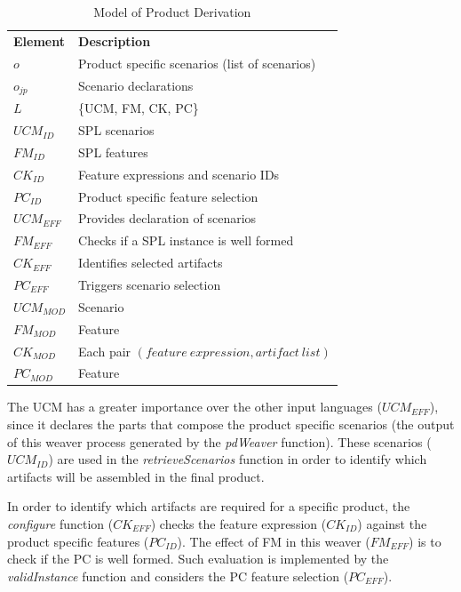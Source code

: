 \documentclass[11pt]{report}
\begin{document}
\begin{table}[htb]
\begin{center}
 \caption{Model of Product Derivation} \label{tab:pd-weaver}
\begin{tabular}{p{0.6in}p{2.4in}}
   \hline\noalign{\smallskip}
  {\bf Element} & {\bf Description} \\
   \noalign{\smallskip}
   \hline
   \noalign{\smallskip}
   $o$               & Product specific scenarios (list of scenarios) \\ 
   $o_{jp}$        & Scenario declarations \\ 
   $L$               & \{UCM, FM, CK, PC\} \\ 
   $UCM_{ID}$ & SPL scenarios \\ 
   $FM_{ID}$    & SPL features \\ 
   $CK_{ID}$    & Feature expressions and scenario IDs\\  
   $PC_{ID}$    & Product specific feature selection \\ 
   $UCM_{EFF}$ & Provides declaration of scenarios \\  
   $FM_{EFF}$    & Checks if a SPL instance is well formed \\ 
   $CK_{EFF}$    & Identifies selected artifacts  \\ 
   $PC_{EFF}$    &Triggers scenario selection \\
   $UCM_{MOD}$ & Scenario \\  
   $FM_{MOD}$   & Feature \\ 
   $CK_{MOD}$    & Each pair $(feature\ expression, artifact\ list)$  \\ 
   $PC_{MOD}$    & Feature \\
  \hline
  \end{tabular}
\end{center}
\end{table}

The UCM has a greater importance over the other input languages ($UCM_{EFF}$), since it declares the parts that compose the product specific scenarios (the 
output of this weaver process generated by the \emph{pdWeaver} function). These scenarios ($UCM_{ID}$) are used in the \emph{retrieveScenarios} function in order to identify which artifacts will be assembled in the final product.     

In order to identify which artifacts are required for a specific product, the \emph{configure} function ($CK_{EFF}$) checks the feature expression ($CK_{ID}$) against the product specific features ($PC_{ID}$). The effect of FM in this weaver ($FM_{EFF}$) is to check if the PC is well formed. Such evaluation is implemented by the \emph{validInstance} function and considers the PC feature selection ($PC_{EFF}$). 
  
\end{document}

